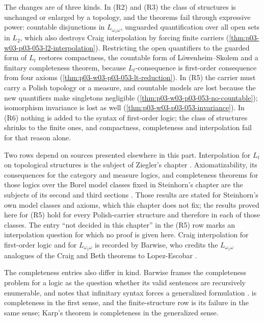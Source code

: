 The changes are of three kinds. In (R2) and (R3) the class of structures
is unchanged or enlarged by a topology, and the theorems fail through
expressive power: countable disjunctions in \(L_{\omega_1\omega}\),
unguarded quantification over all open sets in \(L_2\), which also
destroys Craig interpolation by forcing finite carriers
(\cref{thm:p03-w03-p03-053-l2-interpolation}). Restricting the
open quantifiers to the guarded form of \(L_t\) restores compactness, the
countable form of L\"owenheim--Skolem and a finitary completeness theorem,
because \(L_t\)-consequence is first-order consequence from four axioms
(\cref{thm:p03-w03-p03-053-lt-reduction}). In (R5) the carrier must carry
a Polish topology or a measure, and countable models are lost because
the new quantifiers make singletons negligible
(\cref{thm:p03-w03-p03-053-no-countable}); isomorphism invariance is lost
as well (\cref{thm:p03-w03-p03-053-invariance}). In (R6) nothing is added
to the syntax of first-order logic; the class of structures shrinks to the
finite ones, and compactness, completeness and interpolation fail for that
reason alone.

Two rows depend on sources presented elsewhere in this part. Interpolation
for \(L_t\) on topological structures is the subject of Ziegler's chapter
\cite[ch.~XV, \S2, from p.~560]{Ziegler1985TopologicalModelTheory}.
Axiomatizability, its consequences for the category and measure logics,
and completeness theorems for those logics over the Borel model classes
fixed in Steinhorn's chapter are the subjects of its second and third
sections \cite[ch.~XVI, \S2, from p.~586 and \S3, from
p.~591]{Steinhorn1985BorelMeasureCategory}. Those results are stated for
Steinhorn's own model classes and axioms, which this chapter does not fix;
the results proved here for (R5) hold for every Polish-carrier structure
and therefore in each of those classes. The entry ``not decided in this
chapter'' in the (R5) row marks an interpolation question for which no
proof is given here.
Craig interpolation for first-order logic and for \(L_{\omega_1\omega}\) is
recorded by Barwise, who credits the \(L_{\omega_1\omega}\) analogues of the
Craig and Beth theorems to Lopez-Escobar
\cite[\S1.6, p.~10]{Barwise1985BackgroundAims}.

The completeness entries also differ in kind. Barwise frames the
completeness problem for a logic as the question whether its valid
sentences are recursively enumerable, and notes that infinitary syntax
forces a generalized formulation \cite[\S1.3, pp.~6--7 and \S1.6,
p.~10]{Barwise1985BackgroundAims}. 
is completeness in the first sense, and the finite-structure row is its
failure in the same sense; Karp's theorem is completeness in the
generalized sense.

